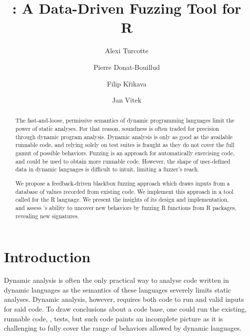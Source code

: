 \documentclass[sigplan,screen]{acmart}
\author{Alexi Turcotte}
\affiliation{%
  \institution{Northeastern University}
  \city{Boston}
  \state{MA}
  \country{USA}
}
\author{Pierre Donat-Bouillud}
\affiliation{%
  \institution{Czech Technical University Prague}
  \city{Prague}
  \country{Czech Republic}
}
\author{Filip K\v{r}ikava}
\affiliation{%
  \institution{Czech Technical University Prague}
  \city{Prague}
  \country{Czech Republic}
}
\author{Jan Vitek}
\affiliation{%
  \institution{Northeastern University}
  \city{Boston}
  \state{MA}
  \country{USA}
}
\begin{document}
\title{\tool: A Data-Driven Fuzzing Tool for R}

\begin{abstract}
The fast-and-loose, permissive semantics of dynamic programming
languages limit the power of static analyses. For that reason, soundness is often
traded for precision through dynamic program analysis.  Dynamic
analysis is only as good as the available runnable code, and relying
solely on test suites is fraught as they do not cover the full gamut of
possible behaviors. Fuzzing is an approach for automatically
exercising code, and could be used to obtain more runnable code.
However, the shape of user-defined data in dynamic languages is
difficult to intuit, limiting a fuzzer's reach.  

We propose a feedback-driven blackbox fuzzing approach which draws inputs from a
database of values recorded from existing code.  We implement this
approach in a tool called \tool for the R language.  We
present the insights of its design and implementation, and assess
\tool's ability to uncover new behaviors by fuzzing \UFNumFunctions R
functions from \UFNumPackages R packages, revealing
\UFSignatrSignatures new signatures.
\end{abstract}

\maketitle

\section{Introduction}\label{sec:introduction}

Dynamic analysis is often the only practical way to analyse code
written in dynamic languages as the semantics of these languages
severely limits static analyses.  Dynamic analysis, however, requires
both code to run and valid inputs for said code. To draw conclusions
about a code base, one could run the existing, runnable code, \Eg,
tests, but such code paints an incomplete picture as it is challenging
to fully cover the range of behaviors allowed by dynamic languages.
\end{document}
